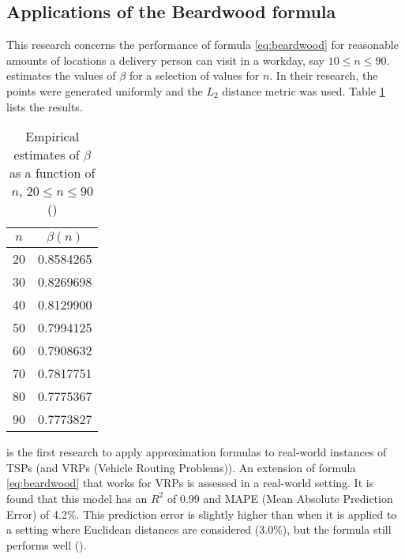 \documentclass[12pt]{article}
\numberwithin{equation}{section}
\newcommand{\1}[1]{\,I_{#1}} %
\begin{document}
\subsection{Applications of the Beardwood formula}
This research concerns the performance of formula \ref{eq:beardwood} for reasonable amounts of
locations a delivery person can visit in a workday, say $10\leq n\leq90$. \cite{lei2015dynamic}
estimates the values of $\beta$ for a selection of values for $n$.
In their research, the points were generated uniformly and the $L_2$ distance metric was used.
Table \ref{tab:beta-values} lists the results.
\begin{table}[H]
	\centering
	\caption{Empirical estimates of $\beta$ as a function of $n$, $20 \leq n \leq 90$\\
		(\cite{lei2015dynamic})}
	\label{tab:beta-values}
	\begin{tabular}{cc}
		\toprule
		$n$ & $\beta(n)$ \\
		\midrule
		20  & 0.8584265  \\
		30  & 0.8269698  \\
		40  & 0.8129900  \\
		50  & 0.7994125  \\
		60  & 0.7908632  \\
		70  & 0.7817751  \\
		80  & 0.7775367  \\
		90  & 0.7773827  \\
		\bottomrule
	\end{tabular}
\end{table}
\cite{figliozzi2008planning} is the first research to apply approximation formulas to real-world
instances of TSPs (and VRPs (Vehicle Routing Problems)). An extension of formula
\ref{eq:beardwood} that works for VRPs is assessed in a real-world setting. It is found that this
model has an $R^2$ of 0.99 and MAPE (Mean Absolute Prediction Error) of 4.2\%. This prediction error
is slightly higher than when it is applied to a setting where Euclidean distances are considered (3.0\%),
but the formula still performs well (\cite{figliozzi2008planning}).
\end{document}
